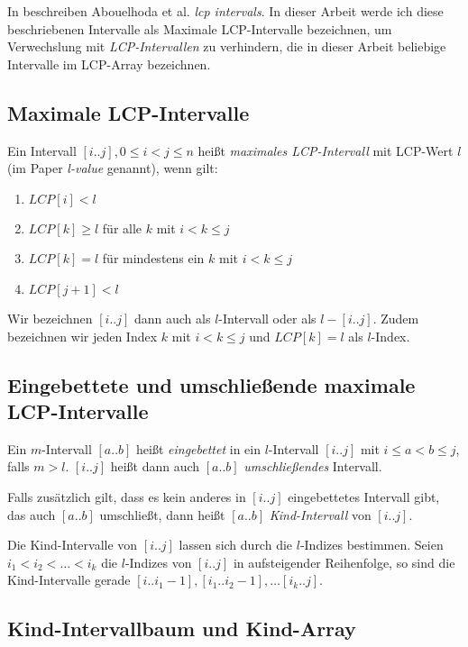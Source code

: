 In \cite{abouelhoda_optimal_2002} beschreiben Abouelhoda et al. \textit{lcp intervals}. In dieser Arbeit werde ich diese beschriebenen Intervalle als Maximale LCP-Intervalle bezeichnen, um Verwechslung mit \textit{LCP-Intervallen} zu verhindern, die in dieser Arbeit beliebige Intervalle im LCP-Array bezeichnen.

\subsection{Maximale LCP-Intervalle}
\label{maxlcpint}

Ein Intervall $[i..j], 0 \leq i < j \leq n$ heißt \textit{maximales LCP-Intervall} mit LCP-Wert $l$ (im Paper \textit{l-value} genannt), wenn gilt:

\begin{enumerate}
	\item $LCP[i] < l$
	\item $LCP[k] \geq l$ für alle $k$ mit $i < k \leq j$
	\item $LCP[k] = l$ für mindestens ein $k$ mit $i < k \leq j$
	\item $LCP[j + 1] < l$
\end{enumerate}

Wir bezeichnen $[i..j]$ dann auch als $l$-Intervall oder als $l-[i..j]$. Zudem bezeichnen wir jeden Index $k$ mit $i < k \leq j$ und $LCP[k] = l$ als $l$-Index.

\subsection{Eingebettete und umschließende maximale LCP-Intervalle}

Ein $m$-Intervall $[a..b]$ heißt \textit{eingebettet} in ein $l$-Intervall $[i..j]$ mit $i \leq a < b \leq j$, falls $m > l$. $[i..j]$ heißt dann auch $[a..b]$ \textit{umschließendes} Intervall.

Falls zusätzlich gilt, dass es kein anderes in $[i..j]$ eingebettetes Intervall gibt, das auch $[a..b]$ umschließt, dann heißt $[a..b]$ \textit{Kind-Intervall} von $[i..j]$.

Die Kind-Intervalle von $[i..j]$ lassen sich durch die $l$-Indizes bestimmen. Seien $i_1 < i_2 < \dots < i_k$ die $l$-Indizes von $[i..j]$ in aufsteigender Reihenfolge, so sind die 
Kind-Intervalle gerade $[i.. i_1 - 1], [i_1.. i_2 - 1], \dots [i_k..j]$.

\subsection{Kind-Intervallbaum und Kind-Array}

